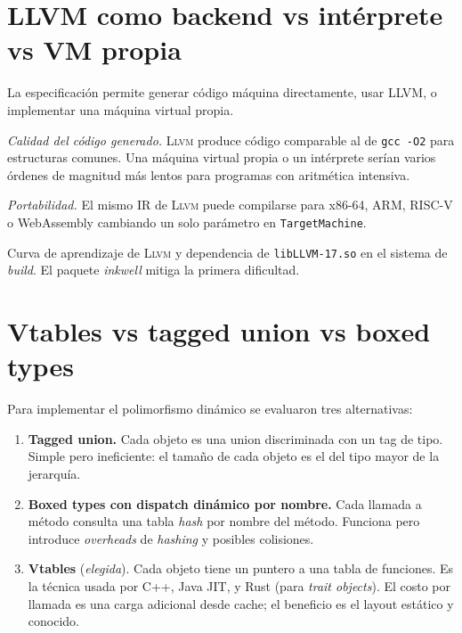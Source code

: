 \documentclass[11pt,a4paper,oneside,openany]{report}
\newcommand{\code}[1]{\texttt{#1}}
\newcommand{\llvm}{\textsc{Llvm}}
\newcommand{\inkwell}{\textit{inkwell}}
\begin{document}
\section{LLVM como backend vs intérprete vs VM propia}

La especificación permite generar código máquina directamente, usar LLVM, o
implementar una máquina virtual propia.

\begin{description}[style=nextline]
  \item[Argumento principal]
    \textit{Calidad del código generado.} \llvm{} produce código comparable al
    de \code{gcc -O2} para estructuras comunes. Una máquina virtual propia o un
    intérprete serían varios órdenes de magnitud más lentos para programas con
    aritmética intensiva.
  \item[Argumento secundario]
    \textit{Portabilidad.} El mismo IR de \llvm{} puede compilarse para x86-64,
    ARM, RISC-V o WebAssembly cambiando un solo parámetro en
    \code{TargetMachine}.
  \item[Coste]
    Curva de aprendizaje de \llvm{} y dependencia de \code{libLLVM-17.so} en el
    sistema de \textit{build}. El paquete \inkwell{} mitiga la primera dificultad.
\end{description}

\section{Vtables vs tagged union vs boxed types}

Para implementar el polimorfismo dinámico se evaluaron tres alternativas:

\begin{enumerate}
  \item \textbf{Tagged union.} Cada objeto es una union discriminada con un tag
    de tipo. Simple pero ineficiente: el tamaño de cada objeto es el del tipo
    mayor de la jerarquía.
  \item \textbf{Boxed types con dispatch dinámico por nombre.} Cada llamada
    a método consulta una tabla \textit{hash} por nombre del método. Funciona
    pero introduce \textit{overheads} de \textit{hashing} y posibles colisiones.
  \item \textbf{Vtables} (\textit{elegida}). Cada objeto tiene un puntero a una
    tabla de funciones. Es la técnica usada por C++, Java JIT, y Rust (para
    \textit{trait objects}). El costo por llamada es una carga adicional desde
    cache; el beneficio es el layout estático y conocido.
\end{enumerate}
\end{document}
